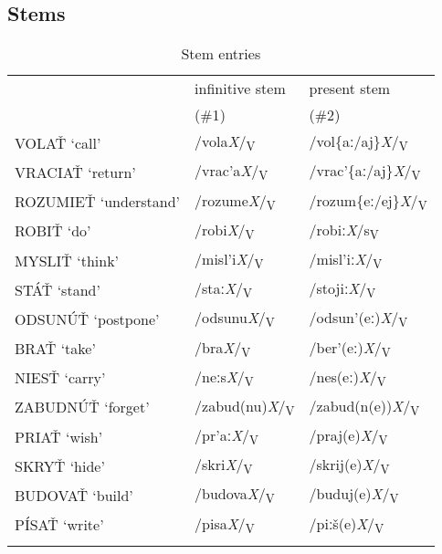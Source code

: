 \documentclass[output=paper,colorlinks,citecolor=brown]{langscibook}
\begin{document}
\subsection{Stems}\label{sec:Stems}
\begin{table}[b]
\caption{Stem entries}
\label{tab:pitsch:6}
\begin{tabular}{lll}
\lsptoprule
        & infinitive stem   & present stem \\
        & (\textsc{\#1}) & (\textsc{\#2}) \\
\midrule
  VOLAŤ `call' & /vola\textit{X}/\textsubscript{V} & /vol\{aː/aj\}\textit{X}/\textsubscript{V} \\
  VRACIAŤ `return' & /vrac'a\textit{X}/\textsubscript{V} & /vrac'\{aː/aj\}\textit{X}/\textsubscript{V} \\
  ROZUMIEŤ `understand' & /rozume\textit{X}/\textsubscript{V} &
  /rozum\{eː/ej\}\textit{X}/\textsubscript{V} \\
\midrule
  ROBIŤ `do' & /robi\textit{X}/\textsubscript{V} & /robiː\textit{X}/s\textsubscript{V} \\
  MYSLIŤ `think' & /misl'i\textit{X}/\textsubscript{V} & /misl'iː\textit{X}/\textsubscript{V} \\
  STÁŤ `stand' & /staː\textit{X}/\textsubscript{V} & /stojiː\textit{X}/\textsubscript{V} \\
\midrule
  ODSUNÚŤ `postpone' & /odsunu\textit{X}/\textsubscript{V} & /odsun'(eː)\textit{X}/\textsubscript{V} \\
  BRAŤ `take' & /bra\textit{X}/\textsubscript{V} & /ber'(eː)\textit{X}/\textsubscript{V} \\
  NIESŤ `carry' & /neːs\textit{X}/\textsubscript{V} & /nes(eː)\textit{X}/\textsubscript{V} \\
\midrule
  ZABUDNÚŤ `forget' & /zabud(nu)\textit{X}/\textsubscript{V} & /zabud(n(e))\textit{X}/\textsubscript{V} \\
  PRIAŤ `wish' & /pr'aː\textit{X}/\textsubscript{V} & /praj(e)\textit{X}/\textsubscript{V} \\
  SKRYŤ `hide' & /skri\textit{X}/\textsubscript{V} & /skrij(e)\textit{X}/\textsubscript{V} \\
  BUDOVAŤ `build' & /budova\textit{X}/\textsubscript{V} & /buduj(e)\textit{X}/\textsubscript{V} \\
  PÍSAŤ `write' & /pisa\textit{X}/\textsubscript{V} & /piːš(e)\textit{X}/\textsubscript{V} \\
\lspbottomrule
\end{tabular}
\end{table}
\end{document}
